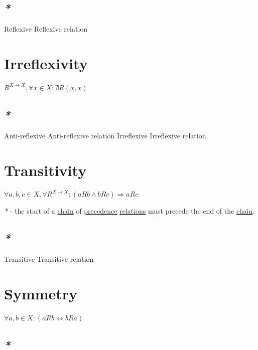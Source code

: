 \documentclass[a4paper,14pt,oneside]{book}
\begin{document}
\subsection{\emph{*}}
\label{sec:orgea75b1a}

\label{orgabd2a48}Reflexive
\label{org7c208e0}Reflexive relation

\section{\label{orgdaa5090}Irreflexivity}
\label{sec:orgb5d7463}

\(R^{X \to X}, \forall x \in X : \nexists R(x, x)\)

\subsection{\emph{*}}
\label{sec:org67473a8}

\label{org912634b}Anti-reflexive
\label{orge5dbdbd}Anti-reflexive relation
\label{orgaf41fcd}Irreflexive
\label{org18e7218}Irreflexive relation

\section{\label{orgf2658ea}Transitivity}
\label{sec:orgf977927}

\(\forall a,b,c \in X, \forall R^{X \to X} : (aRb \land bRc) \Rightarrow aRc\)

\emph{*} - the start of a \hyperref[org1c2ad95]{chain} of \hyperref[org03e4179]{precedence} \hyperref[org893ad95]{relations} must precede the end of the \hyperref[org1c2ad95]{chain}.

\subsection{\emph{*}}
\label{sec:org329bd0a}

\label{org3be5573}Transitive
\label{orga629a7d}Transitive relation

\section{\label{org4ad57b6}Symmetry}
\label{sec:org321008a}

\(\forall a,b \in X : (aRb \iff bRa)\)

\subsection{\emph{*}}
\label{sec:orge147cc5}
\end{document}

